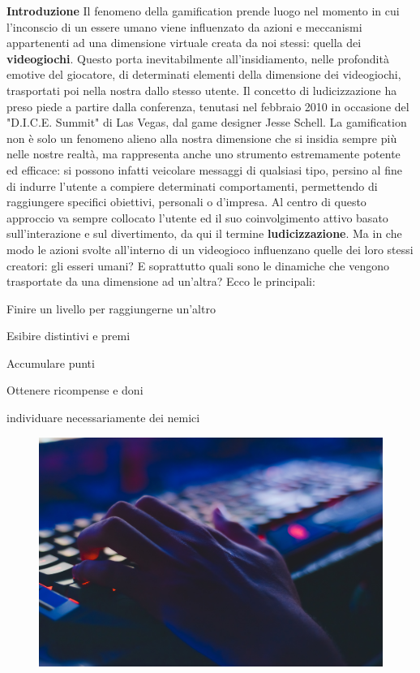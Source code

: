 \textbf{Introduzione}
Il fenomeno della gamification prende luogo nel momento in cui l'inconscio di un essere umano viene influenzato da azioni e meccanismi appartenenti ad una dimensione virtuale creata da noi stessi: quella dei \textbf{videogiochi}. Questo porta inevitabilmente all'insidiamento, nelle profondità emotive del giocatore, di determinati elementi della dimensione dei videogiochi, trasportati poi nella nostra dallo stesso utente.
Il concetto di ludicizzazione ha preso piede a partire dalla conferenza, tenutasi nel febbraio 2010 in occasione del "D.I.C.E. Summit" di Las Vegas, dal game designer Jesse Schell.
La gamification non è solo un fenomeno alieno alla nostra dimensione che si insidia sempre più nelle nostre realtà, ma rappresenta anche uno strumento estremamente potente ed efficace: si possono infatti veicolare messaggi di qualsiasi tipo, persino al fine di indurre l'utente a compiere determinati comportamenti, permettendo di raggiungere specifici obiettivi, personali o d’impresa. Al centro di questo approccio va sempre collocato l’utente ed il suo coinvolgimento attivo basato sull'interazione e sul divertimento, da qui il termine \textbf{ludicizzazione}.
Ma in che modo le azioni svolte all'interno di un videogioco influenzano quelle dei loro stessi creatori: gli esseri umani? E soprattutto quali sono le dinamiche che vengono trasportate da una dimensione ad un'altra? Ecco le principali:

\begin{compactitem}
	\item Finire un livello per raggiungerne un'altro
	\item Esibire distintivi e premi
	\item Accumulare punti
	\item Ottenere ricompense e doni
	\item individuare necessariamente dei nemici
\end{compactitem}


	\begin{figure}[h]
		\begin{center}
		\includegraphics[width=.40\textwidth]{img/image7.jpg}
		\label{gr01}
		\end{center}
	\end{figure}

